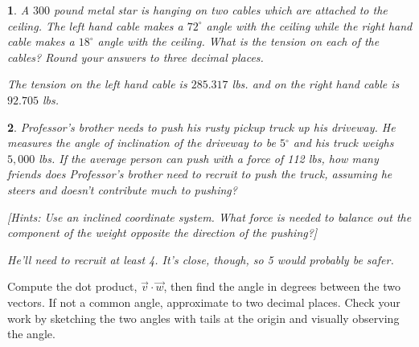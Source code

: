 \documentclass{amsbook}
\newtheorem{exc}{}
\newenvironment{ex}{\begin{exc}\normalfont}{\end{exc}}
\numberwithin{section}{chapter}
\numberwithin{equation}{chapter}
\newcommand{\dg}{{^\circ}}
\begin{document}
\begin{ex}
	A $300$ pound metal star is hanging on two cables which are attached to the ceiling.  The left hand cable makes a $72^{\circ}$ angle with the ceiling while the right hand cable makes a $18^{\circ}$ angle with the ceiling.  What is the tension on each of the cables?  Round your answers to three decimal places.
	\begin{sol}
		The tension on the left hand cable is $285.317$ lbs. and on the right hand cable is $92.705$ lbs.
	\end{sol}
\end{ex}

\begin{ex}
	Professor's brother needs to push his rusty pickup truck up his driveway. He measures the angle of inclination of the driveway to be $5\dg$ and his truck weighs $5,000$ lbs. If the average person can push with a force of 112 lbs, how many friends does Professor's brother need to recruit to push the truck, assuming he steers and doesn't contribute much to pushing?
	
	[Hints: Use an inclined coordinate system. What force is needed to balance out the component of the weight opposite the direction of the pushing?]
	\begin{sol}
		He'll need to recruit at least 4. It's close, though, so 5 would probably be safer.
	\end{sol}
\end{ex}

\bigskip
	Compute the dot product, $\vec{v} \cdot \vec{w}$, then find the angle in degrees between the two vectors. If not a common angle, approximate to two decimal places. Check your work by sketching the two angles with tails at the origin and visually observing the angle.
	
\end{document}
